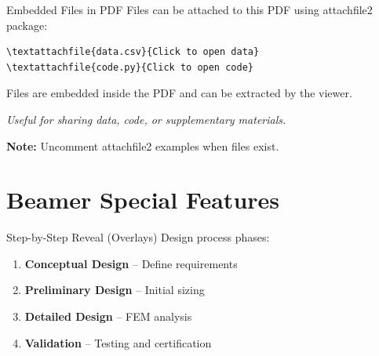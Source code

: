 \begin{frame}[fragile]{Embedded Files in PDF}
    Files can be attached to this PDF using attachfile2 package:

    \vspace{0.3cm}

    \begin{lstlisting}[basicstyle=\ttfamily\small, frame=none, numbers=none]
\textattachfile{data.csv}{Click to open data}
\textattachfile{code.py}{Click to open code}
    \end{lstlisting}

    \vspace{0.3cm}

    {\small Files are embedded inside the PDF and can be extracted by the viewer.}

    \vspace{0.3cm}

    \textit{Useful for sharing data, code, or supplementary materials.}

    \vspace{0.3cm}

    {\footnotesize\textbf{Note:} Uncomment attachfile2 examples when files exist.}
\end{frame}

\section{Beamer Special Features}

\begin{frame}{Step-by-Step Reveal (Overlays)}
    Design process phases:

    \begin{enumerate}
        \item<1-> \textbf{Conceptual Design} -- Define requirements
        \item<2-> \textbf{Preliminary Design} -- Initial sizing
        \item<3-> \textbf{Detailed Design} -- FEM analysis
        \item<4-> \textbf{Validation} -- Testing and certification
    \end{enumerate}

    \vspace{0.5cm}

\end{frame}

